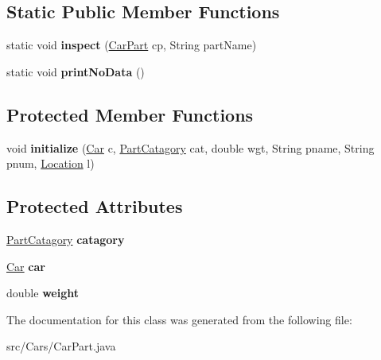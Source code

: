 \subsection*{Static Public Member Functions}
\begin{DoxyCompactItemize}
\item 
\hypertarget{classCars_1_1CarPart_aa99ded7306f0a2e9efe0ffee86d8dc36}{}static void {\bfseries inspect} (\hyperlink{classCars_1_1CarPart}{Car\+Part} cp, String part\+Name)\label{classCars_1_1CarPart_aa99ded7306f0a2e9efe0ffee86d8dc36}

\item 
\hypertarget{classCars_1_1CarPart_a076adbc952554a628b9351814ec12285}{}static void {\bfseries print\+No\+Data} ()\label{classCars_1_1CarPart_a076adbc952554a628b9351814ec12285}

\end{DoxyCompactItemize}
\subsection*{Protected Member Functions}
\begin{DoxyCompactItemize}
\item 
\hypertarget{classCars_1_1CarPart_a46569fe9c033ec91ee0b31874460527a}{}void {\bfseries initialize} (\hyperlink{classCars_1_1Car}{Car} c, \hyperlink{enumEnums_1_1PartCatagory}{Part\+Catagory} cat, double wgt, String pname, String pnum, \hyperlink{enumEnums_1_1Location}{Location} l)\label{classCars_1_1CarPart_a46569fe9c033ec91ee0b31874460527a}

\end{DoxyCompactItemize}
\subsection*{Protected Attributes}
\begin{DoxyCompactItemize}
\item 
\hypertarget{classCars_1_1CarPart_a34325cfedc4e5edda4c03c8c96f85a98}{}\hyperlink{enumEnums_1_1PartCatagory}{Part\+Catagory} {\bfseries catagory}\label{classCars_1_1CarPart_a34325cfedc4e5edda4c03c8c96f85a98}

\item 
\hypertarget{classCars_1_1CarPart_a6cc9b41d99cf9ae855f44b3295384e56}{}\hyperlink{classCars_1_1Car}{Car} {\bfseries car}\label{classCars_1_1CarPart_a6cc9b41d99cf9ae855f44b3295384e56}

\item 
\hypertarget{classCars_1_1CarPart_a6d52f6a89059a44d113fa63e5169b3fc}{}double {\bfseries weight}\label{classCars_1_1CarPart_a6d52f6a89059a44d113fa63e5169b3fc}

\end{DoxyCompactItemize}


The documentation for this class was generated from the following file\+:\begin{DoxyCompactItemize}
\item 
src/\+Cars/Car\+Part.\+java\end{DoxyCompactItemize}
